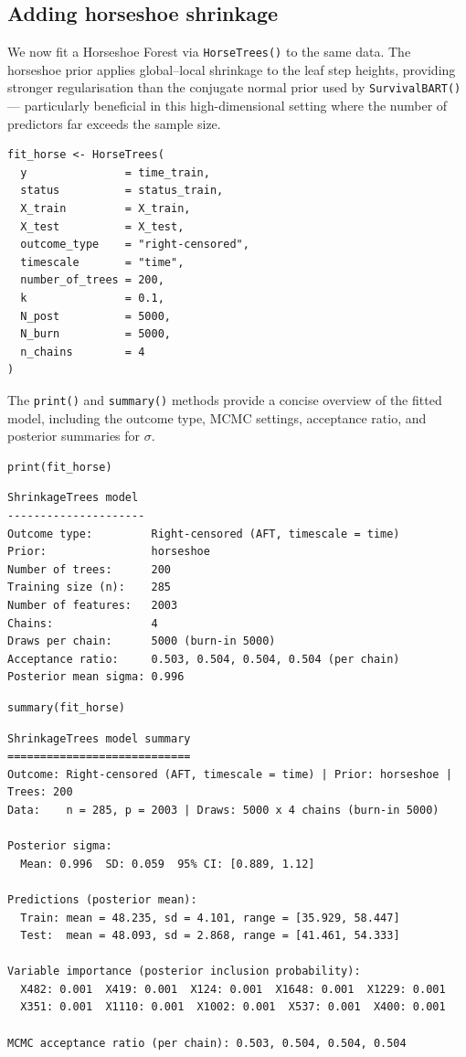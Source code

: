 \subsection{Adding horseshoe shrinkage}\label{adding-horseshoe-shrinkage}

We now fit a Horseshoe Forest via \texttt{HorseTrees()} to the same data. The horseshoe prior applies global--local shrinkage to the leaf step heights, providing stronger regularisation than the conjugate normal prior used by \texttt{SurvivalBART()} --- particularly beneficial in this high-dimensional setting where the number of predictors far exceeds the sample size.

\begin{verbatim}
fit_horse <- HorseTrees(
  y               = time_train,
  status          = status_train,
  X_train         = X_train,
  X_test          = X_test,
  outcome_type    = "right-censored",
  timescale       = "time",
  number_of_trees = 200,
  k               = 0.1,
  N_post          = 5000,
  N_burn          = 5000,
  n_chains        = 4
)
\end{verbatim}

The \texttt{print()} and \texttt{summary()} methods provide a concise overview of the fitted model, including the outcome type, MCMC settings, acceptance ratio, and posterior summaries for \(\sigma\).

\begin{verbatim}
print(fit_horse)
\end{verbatim}

\begin{verbatim}
ShrinkageTrees model
---------------------
Outcome type:         Right-censored (AFT, timescale = time)
Prior:                horseshoe
Number of trees:      200
Training size (n):    285
Number of features:   2003
Chains:               4
Draws per chain:      5000 (burn-in 5000)
Acceptance ratio:     0.503, 0.504, 0.504, 0.504 (per chain)
Posterior mean sigma: 0.996
\end{verbatim}

\begin{verbatim}
summary(fit_horse)
\end{verbatim}

\begin{verbatim}
ShrinkageTrees model summary
============================
Outcome: Right-censored (AFT, timescale = time) | Prior: horseshoe | Trees: 200
Data:    n = 285, p = 2003 | Draws: 5000 x 4 chains (burn-in 5000)

Posterior sigma:
  Mean: 0.996  SD: 0.059  95% CI: [0.889, 1.12]

Predictions (posterior mean):
  Train: mean = 48.235, sd = 4.101, range = [35.929, 58.447]
  Test:  mean = 48.093, sd = 2.868, range = [41.461, 54.333]

Variable importance (posterior inclusion probability):
  X482: 0.001  X419: 0.001  X124: 0.001  X1648: 0.001  X1229: 0.001
  X351: 0.001  X1110: 0.001  X1002: 0.001  X537: 0.001  X400: 0.001

MCMC acceptance ratio (per chain): 0.503, 0.504, 0.504, 0.504
\end{verbatim}

